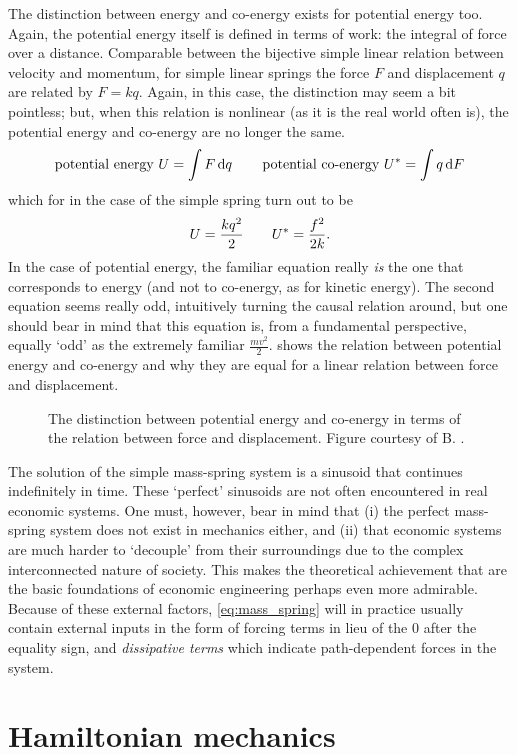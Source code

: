 The distinction between energy and co-energy exists for potential energy too. Again, the potential energy itself is defined in terms of work: the integral of force over a distance. Comparable between the bijective simple linear relation between velocity and momentum, for simple linear springs the force $F$ and displacement $q$ are related by $F = kq$. Again, in this case, the distinction may seem a bit pointless; but, when this relation is nonlinear (as it is the real world often is), the potential energy and co-energy are no longer the same. 
$$ \text{potential energy } U = \int F \dd{q} \qquad \text{potential co-energy } U^* = \int q \dd{F} $$
which for in the case of the simple spring turn out to be
$$ U = \frac{kq^2}{2} \qquad U^* = \frac{f^2}{2k}. $$
In the case of potential energy, the familiar equation really \emph{is} the one that corresponds to energy (and not to co-energy, as for kinetic energy). The second equation seems really odd, intuitively turning the causal relation around, but one should bear in mind that this equation is, from a fundamental perspective, equally `odd' as the extremely familiar $\frac{mv^2}{2}$.  shows the relation between potential energy and co-energy and why they are equal for a linear relation between force and displacement.
\begin{figure}[ht]
    \centering
    
    \caption{The distinction between potential energy and co-energy in terms of the relation between force and displacement. Figure courtesy of B. \citet{Krabbenborg2021}.}
    \label{fig:potential_energy}
\end{figure}
The solution of the simple mass-spring system is a sinusoid that continues indefinitely in time. These `perfect' sinusoids are not often encountered in real economic systems. One must, however, bear in mind that (i) the perfect mass-spring system does not exist in mechanics either, and (ii) that economic systems are much harder to `decouple' from their surroundings due to the complex interconnected nature of society. This makes the theoretical achievement that are the basic foundations of economic engineering perhaps even more admirable. Because of these external factors, \cref{eq:mass_spring} will in practice usually contain external inputs in the form of forcing terms in lieu of the 0 after the equality sign, and \emph{dissipative terms} which indicate path-dependent forces in the system. 

\section{Hamiltonian mechanics}

